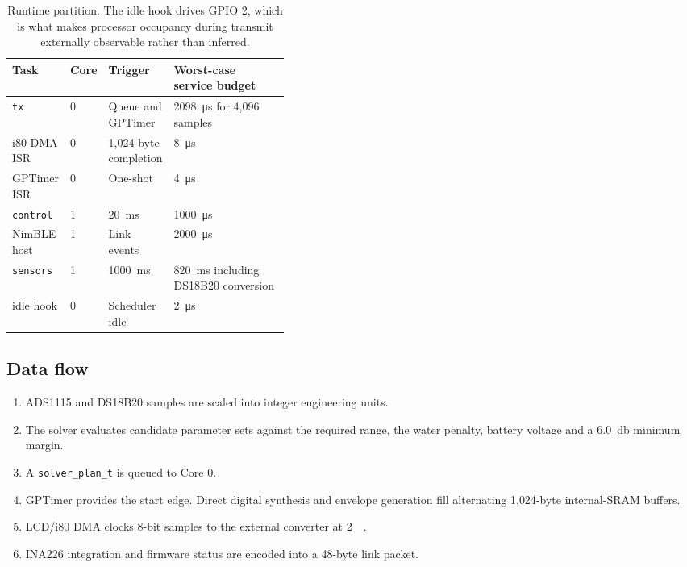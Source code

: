 \documentclass[11pt,a4paper]{article}
\begin{document}
\begin{table}[htbp]
\centering
\small
\begin{tabularx}{\linewidth}{L{0.13\linewidth}L{0.07\linewidth}L{0.20\linewidth}Y}
\toprule
\textbf{Task} & \textbf{Core} & \textbf{Trigger} & \textbf{Worst-case service budget} \\
\midrule
\texttt{tx} & 0 & Queue and GPTimer & \SI{2098}{\micro\second} for 4{,}096 samples \\
i80 DMA ISR & 0 & 1{,}024-byte completion & \SI{8}{\micro\second} \\
GPTimer ISR & 0 & One-shot & \SI{4}{\micro\second} \\
\texttt{control} & 1 & \SI{20}{\milli\second} & \SI{1000}{\micro\second} \\
NimBLE host & 1 & Link events & \SI{2000}{\micro\second} \\
\texttt{sensors} & 1 & \SI{1000}{\milli\second} & \SI{820}{\milli\second} including DS18B20 conversion \\
idle hook & 0 & Scheduler idle & \SI{2}{\micro\second} \\
\bottomrule
\end{tabularx}
\caption{Runtime partition. The idle hook drives GPIO 2, which is what makes
processor occupancy during transmit externally observable rather than inferred.}
\end{table}

\subsection{Data flow}

\begin{enumerate}
\item ADS1115 and DS18B20 samples are scaled into integer engineering units.
\item The solver evaluates candidate parameter sets against the required range,
      the water penalty, battery voltage and a \SI{6.0}{\decibel} minimum
      margin.
\item A \texttt{solver\_plan\_t} is queued to Core 0.
\item GPTimer provides the start edge. Direct digital synthesis and envelope
      generation fill alternating 1{,}024-byte internal-SRAM buffers.
\item LCD/i80 DMA clocks 8-bit samples to the external converter at
      \SI{2}{\mega\Sps}.
\item INA226 integration and firmware status are encoded into a 48-byte link
      packet.
\end{enumerate}
\end{document}
